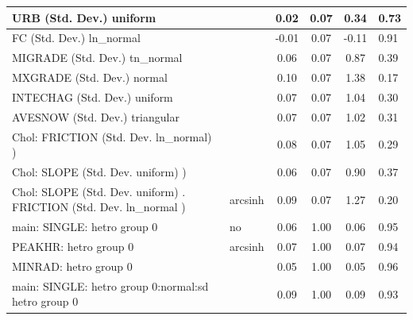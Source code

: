 \begin{table}
\begin{center}
\begin{tabular}{|l|l|c|c|c|l|}
			\hline
			URB (Std. Dev.) uniform &  & 0.02 & 0.07 & 0.34 & 0.73 \\
			\hline
			FC (Std. Dev.) ln_normal &  & -0.01 & 0.07 & -0.11 & 0.91 \\
			\hline
			MIGRADE (Std. Dev.) tn_normal &  & 0.06 & 0.07 & 0.87 & 0.39 \\
			\hline
			MXGRADE (Std. Dev.) normal &  & 0.10 & 0.07 & 1.38 & 0.17 \\
			\hline
			INTECHAG (Std. Dev.) uniform &  & 0.07 & 0.07 & 1.04 & 0.30 \\
			\hline
			AVESNOW (Std. Dev.) triangular &  & 0.07 & 0.07 & 1.02 & 0.31 \\
			\hline
			 Chol: FRICTION (Std. Dev. ln_normal) ) &  & 0.08 & 0.07 & 1.05 & 0.29 \\
			\hline
			 Chol: SLOPE (Std. Dev. uniform) ) &  & 0.06 & 0.07 & 0.90 & 0.37 \\
			\hline
			 Chol: SLOPE (Std. Dev. uniform) . FRICTION (Std. Dev.   ln_normal ) & arcsinh & 0.09 & 0.07 & 1.27 & 0.20 \\
			\hline
			main: SINGLE: hetro group 0 & no & 0.06 & 1.00 & 0.06 & 0.95 \\
			\hline
			PEAKHR: hetro group 0 & arcsinh & 0.07 & 1.00 & 0.07 & 0.94 \\
			\hline
			MINRAD: hetro group 0 &  & 0.05 & 1.00 & 0.05 & 0.96 \\
			\hline
			main: SINGLE: hetro group 0:normal:sd  hetro group 0 &  & 0.09 & 1.00 & 0.09 & 0.93 \\
			\hline
		\end{tabular}
	\end{center}
\end{table}